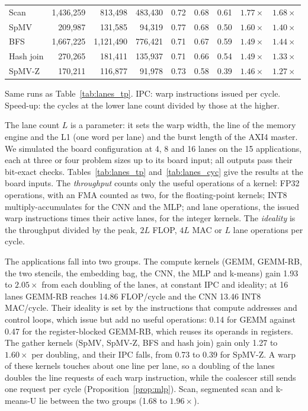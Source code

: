 \documentclass[journal]{IEEEtran}
\begin{document}
\begin{table}[t]
\begin{tabular}{lrrrrrrrr}
Scan           & 1,436,259 & 813,498   & 483,430   & 0.72 & 0.68 & 0.61 & $1.77\times$ & $1.68\times$\\
SpMV           & 209,987   & 131,585   & 94,319    & 0.77 & 0.68 & 0.50 & $1.60\times$ & $1.40\times$\\
BFS            & 1,667,225 & 1,121,490 & 776,421   & 0.71 & 0.67 & 0.59 & $1.49\times$ & $1.44\times$\\
Hash join      & 270,265   & 181,411   & 135,937   & 0.71 & 0.66 & 0.54 & $1.49\times$ & $1.33\times$\\
SpMV-Z         & 170,211   & 116,877   & 91,978    & 0.73 & 0.58 & 0.39 & $1.46\times$ & $1.27\times$\\
\bottomrule
\end{tabular}

\vspace{2pt}
\begin{minipage}{\textwidth}\footnotesize
Same runs as Table~\ref{tab:lanes_tp}. IPC: warp instructions issued per cycle.
Speed-up: the cycles at the lower lane count divided by those at the higher.
\end{minipage}
\end{table}

The lane count $L$ is a parameter: it sets the warp width, the line of the memory
engine and the L1 (one word per lane) and the burst length of the AXI4 master. We
simulated the board configuration at 4, 8 and 16 lanes on the 15 applications, each at
three or four problem sizes up to its board input; all outputs pass their bit-exact
checks. Tables~\ref{tab:lanes_tp} and~\ref{tab:lanes_cyc} give the results at the
board inputs. The \emph{throughput} counts only the useful operations of a kernel: FP32
operations, with an FMA counted as two, for the floating-point kernels; INT8
multiply-accumulates for the CNN and the MLP; and lane operations, the issued warp
instructions times their active lanes, for the integer kernels. The \emph{ideality} is
the throughput divided by the peak, $2L$ FLOP, $4L$ MAC or $L$ lane operations per
cycle.

The applications fall into two groups. The compute kernels (GEMM, GEMM-RB, the two
stencils, the embedding bag, the CNN, the MLP and k-means) gain 1.93 to $2.05\times$
from each doubling of the lanes, at constant IPC and ideality; at 16 lanes GEMM-RB
reaches 14.86 FLOP/cycle and the CNN 13.46 INT8 MAC/cycle. Their ideality is set by
the instructions that compute addresses and control loops, which issue but add no
useful operations: 0.14 for GEMM against 0.47 for the register-blocked GEMM-RB, which
reuses its operands in registers. The gather kernels (SpMV, SpMV-Z, BFS and hash join)
gain only 1.27 to $1.60\times$ per doubling, and their IPC falls, from 0.73 to 0.39 for
SpMV-Z. A warp of these kernels touches about one line per lane, so a doubling of the
lanes doubles the line requests of each warp instruction, while the coalescer still
sends one request per cycle (Proposition~\ref{prop:mlp}). Scan, segmented scan and
k-means-U lie between the two groups (1.68 to $1.96\times$).
\end{document}
